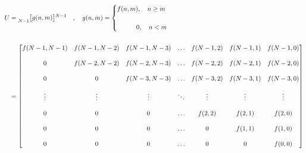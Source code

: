 \documentclass{article}
\begin{document}
\begin{align*}
    U&= \prescript{}{N - 1}{\begin{bmatrix} g(n, m) \end{bmatrix}}^{N - 1} \quad , \quad g(n, m) = \begin{cases}
                                                                                                                    f(n, m), \quad n \geq m \\ \\
                                                                                                        \quad \quad \quad 0, \quad n < m
                                                                                                     \end{cases} \\ \\
     &= \begin{bmatrix}
            f(N - 1, N - 1) & f(N - 1, N - 2) & f(N - 1, N - 3) & \ldots & f(N - 1, 2) & f(N - 1, 1) & f(N - 1, 0) \\ \\
                          0 & f(N - 2, N - 2) & f(N - 2, N - 3) & \ldots & f(N - 2, 2) & f(N - 2, 1) & f(N - 2, 0) \\ \\
                          0 &               0 & f(N - 3, N - 3) & \ldots & f(N - 3, 2) & f(N - 3, 1) & f(N - 3, 0) \\ \\
                     \vdots &          \vdots &          \vdots & \ddots &      \vdots &      \vdots &      \vdots \\ \\
                          0 &               0 &               0 & \ldots & f(    2, 2) & f(    2, 1) & f(    2, 0) \\ \\
                          0 &               0 &               0 & \ldots &           0 & f(    1, 1) & f(    1, 0) \\ \\
                          0 &               0 &               0 & \ldots &           0 &           0 & f(    0, 0)
          \end{bmatrix} \\ \\
  \end{align*}
\end{document}
